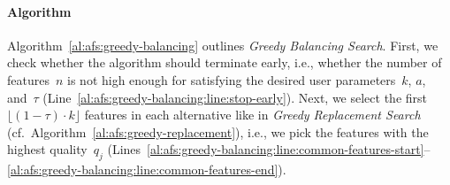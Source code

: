 \documentclass{article}
\theoremstyle{definition}
\begin{document}
\paragraph{Algorithm}

Algorithm~\ref{al:afs:greedy-balancing} outlines \emph{Greedy Balancing Search}.
First, we check whether the algorithm should terminate early, i.e., whether the number of features~$n$ is not high enough for satisfying the desired user parameters~$k$, $a$, and~$\tau$ (Line~\ref{al:afs:greedy-balancing:line:stop-early}).
Next, we select the first $\lfloor (1 - \tau) \cdot k \rfloor$ features in each alternative like in \emph{Greedy Replacement Search} (cf.~Algorithm~\ref{al:afs:greedy-replacement}), i.e., we pick the features with the highest quality~$q_j$ (Lines~\ref{al:afs:greedy-balancing:line:common-features-start}--\ref{al:afs:greedy-balancing:line:common-features-end}).
\end{document}

